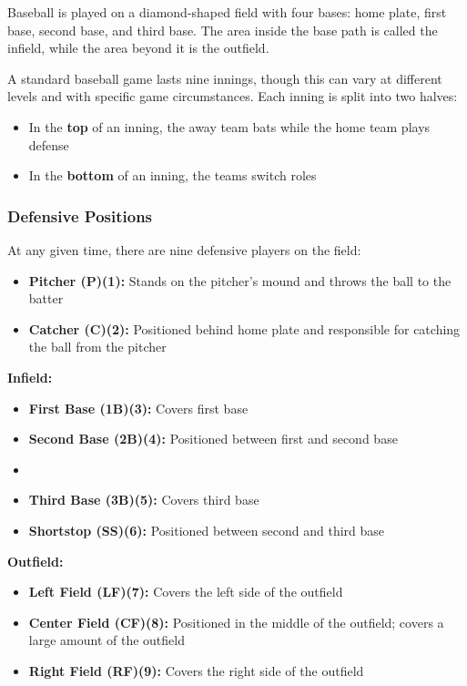 \documentclass{article}
\begin{document}
Baseball is played on a diamond-shaped field with four bases: home plate, first base, second base, and third base. The area inside the base path is called the infield, while the area beyond it is the outfield. 

A standard baseball game lasts nine innings, though this can vary at different levels and with specific game circumstances. Each inning is split into two halves:

\begin{itemize}
    \item In the \textbf{top} of an inning, the away team bats while the home team plays defense
    \item In the \textbf{bottom} of an inning, the teams switch roles 
\end{itemize}

\subsubsection{Defensive Positions} 
At any given time, there are nine defensive players on the field:
\begin{itemize}
    \item \textbf{Pitcher (P)(1):} Stands on the pitcher's mound and throws the ball to the batter
    \item \textbf{Catcher (C)(2):} Positioned behind home plate and responsible for catching the ball from the pitcher
\end{itemize}

\textbf{Infield:}
\begin{itemize}
    \item \textbf{First Base (1B)(3):} Covers first base
    \item \textbf{Second Base (2B)(4):} Positioned between first and second base
    \item \item \textbf{Third Base (3B)(5):} Covers third base
    \item \textbf{Shortstop (SS)(6):} Positioned between second and third base
\end{itemize}

\textbf{Outfield:}
\begin{itemize}
    \item \textbf{Left Field (LF)(7):} Covers the left side of the outfield
    \item \textbf{Center Field (CF)(8):} Positioned in the middle of the outfield; covers a large amount of the outfield
    \item \textbf{Right Field (RF)(9):} Covers the right side of the outfield
\end{itemize}
\end{document}
